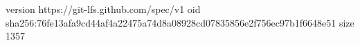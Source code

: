 version https://git-lfs.github.com/spec/v1
oid sha256:76fe13afa9cd44af4a22475a74d8a08928cd07835856e2f756ec97b1f6648e51
size 1357
